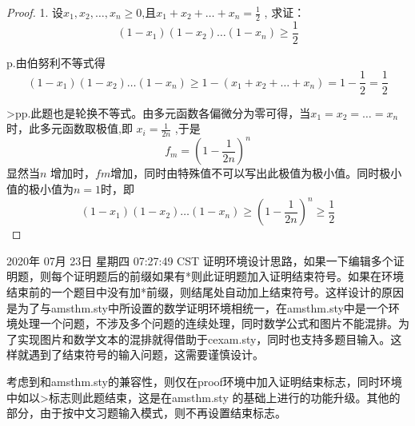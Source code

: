  \begin{proof}
    1. 设$x_1,x_2,\dots,x_n\geqslant 0$,且$x_1+x_2+\dots+x_n=\frac{1}{2}$ , 求证：
    \[
       (1-x_1)(1-x_2)\dots(1-x_n)\geqslant \frac{1}{2}
    \]

    p.由伯努利不等式得
    \[
       (1-x_1)(1-x_2)\dots(1-x_n)
       \geqslant
       1-(x_1+x_2+\dots+x_n)
       =1-\frac{1}{2}=\frac{1}{2}
    \]

   >pp.此题也是轮换不等式。由多元函数各偏微分为零可得，当$x_1=x_2=\dots=x_n$时，此多元函数取极值,即
    $x_i=\frac{1}{2n}$ ,于是
    \[
       f_m= (1-\frac{1}{2n})^n
    \]
    显然当$n$ 增加时，$fm$增加，同时由特殊值不可以写出此极值为极小值。同时极小值的极小值为$n=1$时，即 
    \[
       (1-x_1)(1-x_2)\dots(1-x_n)
       \geqslant
       (1-\frac{1}{2n})^n
       \geqslant
       \frac{1}{2}
    \]

 \end{proof}


2020年 07月 23日 星期四 07:27:49 CST
 证明环境设计思路，如果一下编辑多个证明题，则每个证明题后的前缀如果有*则此证明题加入证明结束符号。如果在环境结束前的一个题目中没有加*前缀，则结尾处自动加上结束符号。这样设计的原因是为了与amsthm.sty中所设置的数学证明环境相统一，在amsthm.sty中是一个环境处理一个问题，不涉及多个问题的连续处理，同时数学公式和图片不能混排。为了实现图片和数学文本的混排就得借助于cexam.sty，同时也支持多题目输入。这样就遇到了结束符号的输入问题，这需要谨慎设计。 

考虑到和amsthm.sty的兼容性，则仅在proof环境中加入证明结束标志，同时环境中如以>标志则此题结束，这是在amsthm.sty 的基础上进行的功能升级。其他的部分，由于按中文习题输入模式，则不再设置结束标志。
